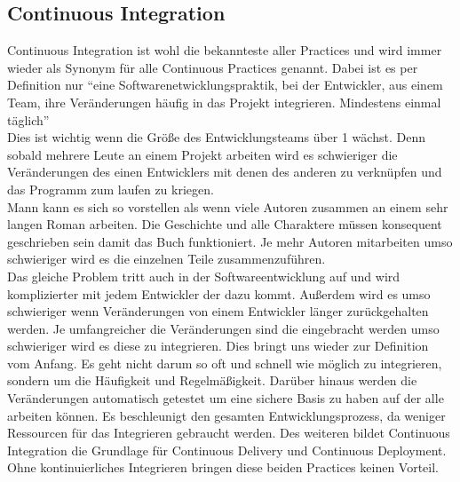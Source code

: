 \subsection{Continuous Integration}
Continuous Integration ist wohl die bekannteste aller Practices und wird immer wieder als Synonym für alle Continuous Practices genannt.\autocite[Vgl.][S.12]{Stahl.2018} Dabei ist es per Definition nur \enquote{eine Softwarenetwicklungspraktik, bei der Entwickler, aus einem Team, ihre Veränderungen häufig in das Projekt integrieren. Mindestens einmal täglich}\autocite[S.12]{Stahl.2018}\\
Dies ist wichtig wenn die Größe des Entwicklungsteams über 1 wächst. Denn sobald mehrere Leute an einem Projekt arbeiten wird es schwieriger die Veränderungen des einen Entwicklers mit denen des anderen zu verknüpfen und das Programm zum laufen zu kriegen.\autocite[Vgl.][S.4]{Stahl.2018}\\ Mann kann es sich so vorstellen als wenn viele Autoren zusammen an einem sehr langen Roman arbeiten. Die Geschichte und alle Charaktere müssen konsequent geschrieben sein damit das Buch funktioniert. Je mehr Autoren mitarbeiten umso schwieriger wird es die einzelnen Teile zusammenzuführen.\\ Das gleiche Problem tritt auch in der Softwareentwicklung auf und wird komplizierter mit jedem Entwickler der dazu kommt. Außerdem wird es umso schwieriger wenn Veränderungen von einem Entwickler länger zurückgehalten werden. Je umfangreicher die Veränderungen sind die eingebracht werden umso schwieriger wird es diese zu integrieren. Dies bringt uns wieder zur Definition vom Anfang. Es geht nicht darum so oft und schnell wie möglich zu integrieren, sondern um die Häufigkeit und Regelmäßigkeit.\autocite[Vgl.][S.3]{Stahl.2018} Darüber hinaus werden die Veränderungen automatisch getestet um eine sichere Basis zu haben auf der alle arbeiten können. Es beschleunigt den gesamten Entwicklungsprozess, da weniger Ressourcen für das Integrieren gebraucht werden. Des weiteren bildet Continuous Integration die Grundlage für Continuous Delivery und Continuous Deployment. Ohne kontinuierliches Integrieren bringen diese beiden Practices keinen Vorteil.
